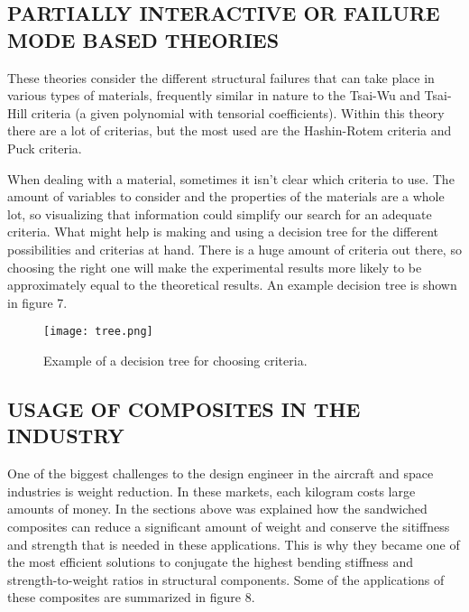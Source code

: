 \documentclass[letterpaper]{article}
\begin{document}
\begin{multicols}{2}
	\subsection*{PARTIALLY INTERACTIVE OR FAILURE MODE BASED THEORIES}
		 These theories consider the different structural failures that can take place in various types of materials, frequently similar in nature to the Tsai-Wu and Tsai-Hill criteria (a given polynomial with tensorial coefficients). Within this theory there are a lot of criterias, but the most used are the Hashin-Rotem criteria and Puck criteria.

		 When dealing with a material, sometimes it isn't clear which criteria to use. The amount of variables to consider and the properties of the materials are a whole lot, so visualizing that information could simplify our search for an adequate criteria. What might help is making and using a decision tree for the different possibilities and criterias at hand. There is a huge amount of criteria out there, so choosing the right one will make the experimental results more likely to be approximately equal to the theoretical results. An example decision tree is shown in figure 7.
\end{multicols}

\begin{figure}[H]
	\centering
	\texttt{[image: tree.png]}
	\caption{Example of a decision tree for choosing criteria.}
\end{figure}
\begin{multicols}{2}
	\section{USAGE OF COMPOSITES IN THE INDUSTRY}
	One of the biggest challenges to the design engineer in the aircraft and space industries is weight reduction. In these markets, each kilogram costs large amounts of money. In the sections above was explained how the sandwiched composites can reduce a significant amount of weight and conserve the sitiffness and strength that is needed in these applications. This is why they became one of the most efficient solutions to conjugate the highest bending stiffness and strength-to-weight ratios in structural components. Some of the applications of these composites are summarized in figure 8.

\end{multicols}
\end{document}
